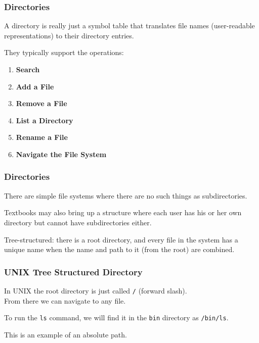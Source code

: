 \begin{frame}
	\frametitle{Directories}

	A directory is really just a symbol table that translates file names (user-readable representations) to their directory entries.

	They typically support the operations:

	\begin{enumerate}
		\item \textbf{Search}
		\item \textbf{Add a File}
		\item \textbf{Remove a File}
		\item \textbf{List a Directory}
		\item \textbf{Rename a File}
		\item \textbf{Navigate the File System}
	\end{enumerate}


\end{frame}

\begin{frame}
	\frametitle{Directories}

	There are simple file systems where there are no such things as subdirectories.

	Textbooks may also bring up a structure where each user has his or her own directory but cannot have subdirectories either.

	Tree-structured: there is a root directory, and every file in the system has a unique name when the name and path to it (from the root) are combined.

\end{frame}

\begin{frame}
	\frametitle{UNIX Tree Structured Directory}

	In UNIX the root directory is just called \texttt{/} (forward slash).\\
	\quad From there we can navigate to any file.

	To run the \texttt{ls} command, we will find it in the \texttt{bin} directory as \texttt{/bin/ls}.

	This is an example of an absolute path.

\end{frame}

